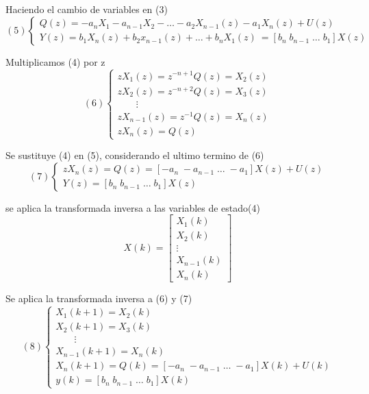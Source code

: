 Haciendo el cambio de variables en (3)
\[(5)
    \left\{
        \begin{array}{lll}
            Q(z) = -a_{n}X_{1} - a_{n-1}X_{2} - \ldots - a_{2}X_{n-1}(z) - a_{1}X_{n}(z) + U(z) \\
            Y(z) = b_{1}X_{n}(z) + b_{2}x_{n-1}(z) + \ldots + b_{n}X_{1}(z) \ =
            [b_{n} \; b_{n-1} \; \ldots \; b_{1}] X(z)
        \end{array}
    \right.
\]

Multiplicamos (4) por z
\[(6)
    \left\{
        \begin{array}{lll}
            zX_{1}(z) = z^{-n+1}Q(z) = X_{2}(z) \\
            zX_{2}(z) = z^{-n+2}Q(z) = X_{3}(z) \\
            \;\;\;\;\;\;\; \vdots \\
            zX_{n-1}(z) = z^{-1}Q(z) = X_{n}(z) \\
            zX_{n}(z) = Q(z)
        \end{array}
    \right.
\]

Se sustituye (4) en (5), considerando el ultimo termino de (6)
\[ (7)
    \left\{
        \begin{array}{lll}
            zX_{n}(z) = Q(z) = [-a_{n} \; -a_{n-1} \; \ldots \; -a_{1}]X(z) + U(z) \\
            Y(z) = [b_{n} \; b_{n-1} \; \ldots \; b_{1}] X(z)
        \end{array}
    \right.
\]

se aplica la transformada inversa a las variables de estado(4)
\[
    X(k) = 
    \begin{bmatrix}
        X_{1}(k) \\
        X_{2}(k) \\
        \vdots \\
        X_{n-1}(k) \\
        X_{n}(k)
    \end{bmatrix}
\]

Se aplica la transformada inversa a (6) y (7)
\[ (8)
    \left\{
        \begin{array}{lll}
            X_{1}(k+1) = X_{2}(k) \\
            X_{2}(k+1) = X_{3}(k) \\
            \;\;\;\;\;\;\; \vdots \\
            X_{n-1}(k+1) = X_{n}(k) \\
            X_{n}(k+1) = Q(k) = [-a_{n} \; -a_{n-1} \; \ldots \; -a_{1}]X(k) + U(k) \\
            y(k) = [b_{n} \; b_{n-1} \; \ldots \; b_{1}] X(k)
        \end{array}
    \right.
\]

